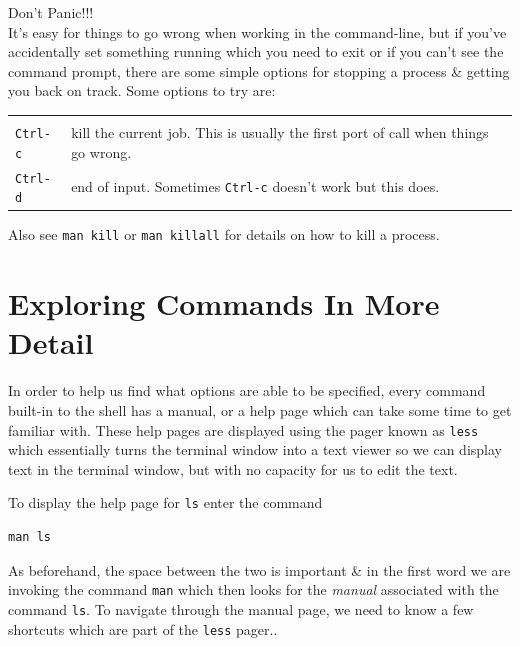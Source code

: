 \documentclass[a4paper,12pt,twoside]{memoir}
\begin{document}
\begin{warning}
{\Huge Don't Panic!!!}\\
It's easy for things to go wrong when working in the command-line, but if you've accidentally set something running which you need to exit or if you can't see the command prompt, there are some simple options for stopping a process \& getting you back on track.
Some options to try are: \\
\begin{tabular}{p{4cm} p{8cm}}
\centering
 & \\
 \texttt{Ctrl-c} & kill the current job.
  This is usually the first port of call when things go wrong. \\
 \texttt{Ctrl-d} & end of input. Sometimes \texttt{Ctrl-c} doesn't work but this does. \\
 \end{tabular}
Also see \texttt{man kill} or \texttt{man killall} for details on how to kill a process. \\
\end{warning}

\clearpage
\section{Exploring Commands In More Detail}

\begin{information}
In order to help us find what options are able to be specified, every command built-in to the shell has a manual, or a help page which can take some time to get familiar with.
These help pages are displayed using the pager known as \texttt{less} which essentially turns the terminal window into a text viewer so we can display text in the terminal window, but with no capacity for us to edit the text. \\
\end{information}

\begin{steps}
To display the help page for \texttt{ls} enter the command \\
\begin{lstlisting}
man ls
\end{lstlisting}
As beforehand, the space between the two is important \& in the first word we are invoking the command \texttt{man} which then looks for the \textit{manual} associated with the command \texttt{ls}.
To navigate through the manual page, we need to know a few shortcuts which are part of the \texttt{less} pager.. \\
\end{steps}
\end{document}
